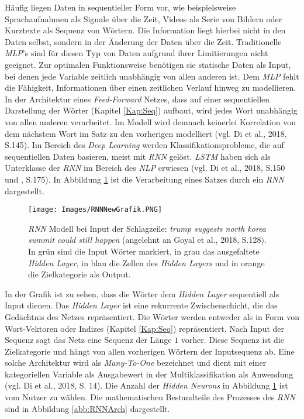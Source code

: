 \documentclass[a4paper,11pt]{article}
\begin{document}
Häufig liegen Daten in sequentieller Form vor, wie beispielsweise Sprachaufnahmen als Signale über die Zeit, Videos als Serie von Bildern oder Kurztexte als Sequenz von Wörtern. Die Information liegt hierbei nicht in den Daten selbst, sondern in der Änderung der Daten über die Zeit. Traditionelle \textit{MLP}'s sind für diesen Typ von Daten aufgrund ihrer Limitierungen nicht geeignet. Zur optimalen Funktionsweise benötigen sie statische Daten als Input, bei denen jede Variable zeitlich unabhängig von allen anderen ist. Dem \textit{MLP} fehlt die Fähigkeit, Informationen über einen zeitlichen Verlauf hinweg zu modellieren. In der Architektur eines \textit{Feed-Forward} Netzes, dass auf einer sequentiellen Darstellung der Wörter (Kapitel \ref{Kap:Seq}) aufbaut, wird jedes Wort unabhängig von allen anderen verarbeitet. Im Modell wird demnach keinerlei Korrelation von dem nächstem Wort im Satz zu den vorherigen modelliert (vgl. Di et al., 2018, S.145). Im Bereich des \textit{Deep Learning} werden Klassifikationsprobleme, die auf sequentiellen Daten basieren, meist mit \textit{RNN} gelöst. \textit{LSTM} haben sich als Unterklasse der \textit{RNN} im Bereich des \textit{NLP} erwiesen (vgl. Di et al., 2018, S.150 und \cite{keras}, S.175). In Abbildung \ref{abb:RNNExample} ist die Verarbeitung eines Satzes durch ein \textit{RNN} dargestellt.

\begin{figure}[!ht]
\begin{center}
\texttt{[image: Images/RNNNewGrafik.PNG]}
\caption{\textit{RNN} Modell bei Input der Schlagzeile: \textit{trump suggests north korea summit could still happen} (angelehnt an Goyal et al., 2018, S.128). In grün sind die Input Wörter markiert, in grau das ausgefaltete \textit{Hidden Layer}, in blau die Zellen des \textit{Hidden Layers} und in orange die Zielkategorie als Output.}
\label{abb:RNNExample}
\end{center}
\end{figure}

In der Grafik ist zu sehen, dass die Wörter dem \textit{Hidden Layer} sequentiell als Input dienen. Das \textit{Hidden Layer} ist eine rekurrente Zwischenschicht, die das Gedächtnis des Netzes repräsentiert. Die Wörter werden entweder als in Form von Wort-Vektoren oder Indizes (Kapitel \ref{Kap:Seq}) repräsentiert. Nach Input der Sequenz sagt das Netz eine Sequenz der Länge $1$ vorher. Diese Sequenz ist die Zielkategorie und hängt von allen vorherigen Wörtern der Inputsequenz ab. 
Eine solche Architektur wird als \textit{Many-To-One}
bezeichnet und dient mit einer kategoriellen Variable als Ausgabewert in der Multiklassifikation als Anwendung (vgl. Di et al., 2018, S. 14). Die Anzahl der \textit{Hidden Neurons} in Abbildung \ref{abb:RNNExample} ist vom Nutzer zu wählen. Die mathematischen Bestandteile des Prozesses des \textit{RNN} sind in Abbildung \ref{abb:RNNArch} dargestellt.
\end{document}
